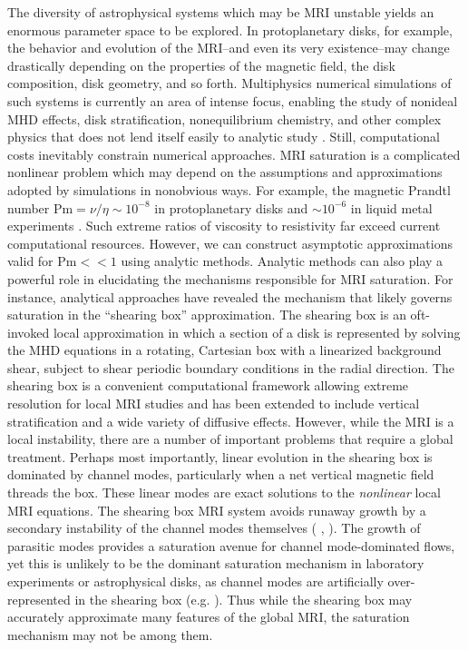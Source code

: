 \documentclass{emulateapj}
\newcommand{\citei}[1]{\citeauthor{#1} \citeyear{#1}}
\newcommand{\Pm}{\mathrm{Pm}}
\begin{document}
The diversity of astrophysical systems which may be MRI unstable yields an enormous parameter space to be explored. In protoplanetary disks, for example, the behavior and evolution of the MRI--and even its very existence--may change drastically depending on the properties of the magnetic field, the disk composition, disk geometry, and so forth. Multiphysics numerical simulations of such systems is currently an area of intense focus, enabling the study of nonideal MHD effects, disk stratification, nonequilibrium chemistry, and other complex physics that does not lend itself easily to analytic study \citep[e.g.][among many others]{Fleming:2003fs,Bai:2011cm, Flock:2013,Suzuki:2014vh}. Still, computational costs inevitably constrain numerical approaches. MRI saturation is a complicated nonlinear problem which may depend on the assumptions and approximations adopted by simulations in nonobvious ways. For example, the magnetic Prandtl number $\Pm = \nu/\eta \sim 10^{-8}$ in protoplanetary disks \citet[e.g.][]{OishiMacLow:2011} and $\sim 10^{-6}$ in liquid metal experiments \citep[e.g.][]{Goodman:2002ix}. Such extreme ratios of viscosity to resistivity far exceed current computational resources. However, we can construct asymptotic approximations valid for $\Pm << 1$ using analytic methods. Analytic methods can also play a powerful role in elucidating the mechanisms responsible for MRI saturation. For instance, analytical approaches have revealed the mechanism that likely governs saturation in the ``shearing box'' approximation. The shearing box is an oft-invoked local approximation in which a section of a disk is represented by solving the MHD equations in a rotating, Cartesian box with a linearized background shear, subject to shear periodic boundary conditions in the radial direction. The shearing box is a convenient computational framework allowing extreme resolution for local MRI studies and has been extended to include vertical stratification and a wide variety of diffusive effects. However, while the MRI is a local instability, there are a number of important problems that require a global treatment. Perhaps most importantly, linear evolution in the shearing box is dominated by channel modes, particularly when a net vertical magnetic field threads the box. These linear modes are exact solutions to the \textit{nonlinear} local MRI equations. The shearing box MRI system avoids runaway growth by a secondary instability of the channel modes themselves (\citei{Goodman:1994ul}, \citei{Pessah:2010ic}). The growth of parasitic modes provides a saturation avenue for channel mode-dominated flows, yet this is unlikely to be the dominant saturation mechanism in laboratory experiments or astrophysical disks, as channel modes are artificially over-represented in the shearing box (e.g. \citei{Latter:2015}). Thus while the shearing box may accurately approximate many features of the global MRI, the saturation mechanism may not be among them. 
\end{document}
